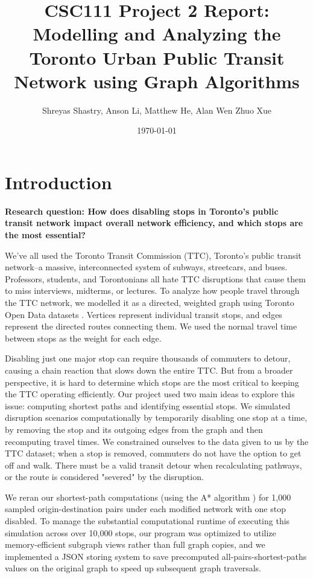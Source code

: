 \documentclass[fontsize=11pt]{article}
\title{CSC111 Project 2 Report: Modelling and Analyzing the Toronto Urban Public Transit Network using Graph Algorithms}
\author{Shreyas Shastry, Anson Li, Matthew He, Alan Wen Zhuo Xue}
\date{\today}
\begin{document}
\maketitle
\section*{Introduction}
\textbf{Research question: How does disabling stops in Toronto's public transit network impact overall network efficiency, and which stops are the most essential?}

\vspace{1em}

We've all used the Toronto Transit Commission (TTC), Toronto's public transit network–a massive, interconnected system of subways, streetcars, and buses. Professors, students, and Torontonians all hate TTC disruptions that cause them to miss interviews, midterms, or lectures. To analyze how people travel through the TTC network, we modelled it as a directed, weighted graph using Toronto Open Data datasets \cite{ttc_data}. Vertices represent individual transit stops, and edges represent the directed routes connecting them. We used the normal travel time between stops as the weight for each edge.

\vspace{1em}

Disabling just one major stop can require thousands of commuters to detour, causing a chain reaction that slows down the entire TTC. But from a broader perspective, it is hard to determine which stops are the most critical to keeping the TTC operating efficiently. Our project used two main ideas to explore this issue: computing shortest paths and identifying essential stops. We simulated disruption scenarios computationally by temporarily disabling one stop at a time, by removing the stop and its outgoing edges from the graph and then recomputing travel times. We constrained ourselves to the data given to us by the TTC dataset; when a stop is removed, commuters do not have the option to get off and walk. There must be a valid transit detour when recalculating pathways, or the route is considered "severed" by the disruption.

\vspace{1em}

We reran our shortest-path computations (using the A* algorithm \cite{cormen2022}) for 1,000 sampled origin-destination pairs under each modified network with one stop disabled. To manage the substantial computational runtime of executing this simulation across over 10,000 stops, our program was optimized to utilize memory-efficient subgraph views rather than full graph copies, and we implemented a JSON storing system to save precomputed all-pairs-shortest-paths values on the original graph to speed up subsequent graph traversals.
\end{document}
